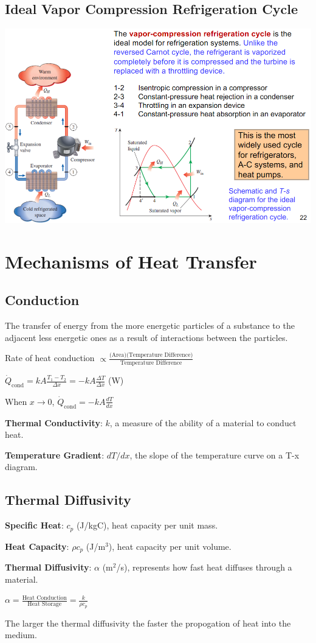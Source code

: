 \documentclass{article}
\begin{document}
\begin{multicols}{3}
    \subsection*{Ideal Vapor Compression Refrigeration Cycle}
    \includegraphics[width=\linewidth]{Images/vcr.png}

    \section*{Mechanisms of Heat Transfer}
    \subsection*{Conduction}
    The transfer of energy from the more energetic particles of a substance to the adjacent less energetic ones as a result of interactions between the particles.\par 
    Rate of heat conduction $\propto \frac{\text{(Area)(Temperature Difference)}}{\text{Temperature Difference}}$\par 
    $\dot{Q}_\text{cond}=kA\frac{T_1-T_2}{\Delta x}=-kA\frac{\Delta T}{\Delta x}$ (W)\par 
    When $x\rightarrow 0$, $\dot{Q}_\text{cond}=-kA\frac{dT}{dx}$\par 
    \textbf{Thermal Conductivity}: $k$, a measure of the ability of a material to conduct heat.\par 
    \textbf{Temperature Gradient}: $dT/dx$, the slope of the temperature curve on a T-x diagram.
    \subsection*{Thermal Diffusivity}
    \textbf{Specific Heat}: $c_p$ (J/kgC), heat capacity per unit mass.\par 
    \textbf{Heat Capacity}: $\rho c_p$ (J/m$^3$), heat capacity per unit volume.\par 
    \textbf{Thermal Diffusivity}: $\alpha$ (m$^2$/s), represents how fast heat diffuses through a material.\par 
    $\alpha = \frac{\text{Heat Conduction}}{\text{Heat Storage}}=\frac{k}{\rho c_p}$\par 
    The larger the thermal diffusivity the faster the propogation of heat into the medium.

\end{multicols}
\end{document}
